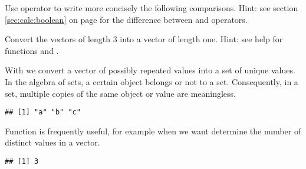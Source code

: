 \documentclass[krantz2]{krantz}\usepackage{knitr}
\begin{document}
\begin{playground}
Use operator  to write more concisely the following comparisons. Hint: see section \ref{sec:calc:boolean} on page \pageref{sec:calc:boolean} for the difference between \code{|} and \code{||} operators.

\begin{knitrout}\footnotesize
{}\color{fgcolor}\begin{kframe}
\begin{alltt}
 \hlkwb{<-} \hlstd{(}\hlstd{,} \hlstd{,} \hlstd{)}
 \hlopt{==}  \hlopt{|}  \hlopt{==}  \hlopt{|}  \hlopt{==}  \hlopt{|}  \hlopt{==} 
\end{alltt}
\end{kframe}
\end{knitrout}

Convert the  vectors of length 3 into a vector of length one. Hint: see help for functions  and .
\end{playground}

With  we convert a vector of possibly repeated values into a set of unique values. In the algebra of sets, a certain object belongs or not to a set. Consequently, in a set, multiple copies of the same object or value are meaningless.

\begin{knitrout}\footnotesize
{}\color{fgcolor}\begin{kframe}
\begin{alltt}
\end{alltt}
\begin{verbatim}
## [1] "a" "b" "c"
\end{verbatim}
\end{kframe}
\end{knitrout}

Function  is frequently useful, for example when we want determine the number of distinct values in a vector.

\begin{knitrout}\footnotesize
{}\color{fgcolor}\begin{kframe}
\begin{alltt}
\hlstd{(}
\end{alltt}
\begin{verbatim}
## [1] 3
\end{verbatim}
\end{kframe}
\end{knitrout}
\end{document}
